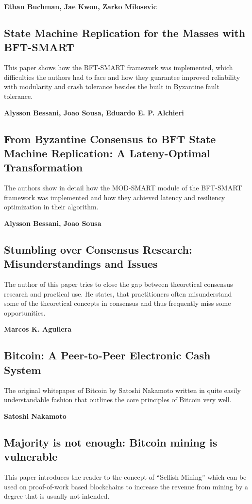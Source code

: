 \textbf{Ethan Buchman, Jae Kwon, Zarko Milosevic}~\cite{tendermint2018}

\subsection{State Machine Replication for the Masses with BFT-SMART}
This paper shows how the BFT-SMART framework was implemented, which difficulties the authors had to face and how they guarantee improved reliability with modularity and crash tolerance besides the built in Byzantine fault tolerance.

\textbf{Alysson Bessani, Joao Sousa, Eduardo E. P. Alchieri}~\cite{bessani14state_machin_replic_masses_bft_smart}

\subsection{From Byzantine Consensus to BFT State Machine Replication: A Lateny-Optimal Transformation}
The authors show in detail how the MOD-SMART module of the BFT-SMART framework was implemented and how they achieved latency and resiliency optimization in their algorithm.

\textbf{Alysson Bessani, Joao Sousa}~\cite{sousa12from_byzan_consen_bft_state_machin_replic}

\subsection{Stumbling over Consensus Research: Misunderstandings and Issues}
The author of this paper tries to close the gap between theoretical consensus research and practical use. He states, that practitioners often misunderstand some of the theoretical concepts in consensus and thus frequently miss some opportunities.

\textbf{Marcos K. Aguilera}~\cite{aguilera2010}

\subsection{Bitcoin: A Peer-to-Peer Electronic Cash System}
The original whitepaper of Bitcoin by Satoshi Nakamoto written in quite easily understandable fashion that outlines the core principles of Bitcoin very well.

\textbf{Satoshi Nakamoto}~\cite{nakamoto2009}

\subsection{Majority is not enough: Bitcoin mining is vulnerable}
This paper introduces the reader to the concept of ``Selfish Mining'' which can be used on proof-of-work based blockchains to increase the revenue from mining by a degree that is usually not intended.

